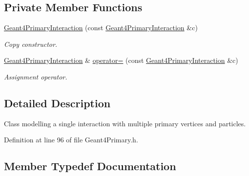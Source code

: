 \subsection*{Private Member Functions}
\begin{DoxyCompactItemize}
\item 
\hyperlink{class_d_d4hep_1_1_simulation_1_1_geant4_primary_interaction_a5ffd12789ddae75709c4677e4a6a7cac}{Geant4\+Primary\+Interaction} (const \hyperlink{class_d_d4hep_1_1_simulation_1_1_geant4_primary_interaction}{Geant4\+Primary\+Interaction} \&c)
\begin{DoxyCompactList}\small\item\em Copy constructor. \end{DoxyCompactList}\item 
\hyperlink{class_d_d4hep_1_1_simulation_1_1_geant4_primary_interaction}{Geant4\+Primary\+Interaction} \& \hyperlink{class_d_d4hep_1_1_simulation_1_1_geant4_primary_interaction_a5def4b2b6d8741d91310f05af3336cb6}{operator=} (const \hyperlink{class_d_d4hep_1_1_simulation_1_1_geant4_primary_interaction}{Geant4\+Primary\+Interaction} \&c)
\begin{DoxyCompactList}\small\item\em Assignment operator. \end{DoxyCompactList}\end{DoxyCompactItemize}


\subsection{Detailed Description}
Class modelling a single interaction with multiple primary vertices and particles. 

Definition at line 96 of file Geant4\+Primary.\+h.



\subsection{Member Typedef Documentation}
\hypertarget{class_d_d4hep_1_1_simulation_1_1_geant4_primary_interaction_a9d53c6c8fa2e7a6094ba91854af945f4}{}\label{class_d_d4hep_1_1_simulation_1_1_geant4_primary_interaction_a9d53c6c8fa2e7a6094ba91854af945f4} 
